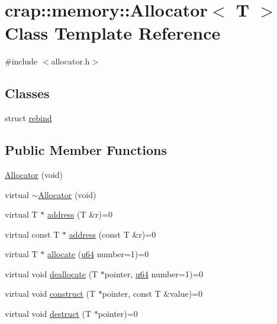\hypertarget{classcrap_1_1memory_1_1_allocator}{\section{crap\-:\-:memory\-:\-:Allocator$<$ T $>$ Class Template Reference}
\label{classcrap_1_1memory_1_1_allocator}
}


{\ttfamily \#include $<$allocator.\-h$>$}

\subsection*{Classes}
\begin{DoxyCompactItemize}
\item 
struct \hyperlink{structcrap_1_1memory_1_1_allocator_1_1rebind}{rebind}
\end{DoxyCompactItemize}
\subsection*{Public Member Functions}
\begin{DoxyCompactItemize}
\item 
\hyperlink{classcrap_1_1memory_1_1_allocator_a0a733c04219f6be60e9ed9ddd9bdad80}{Allocator} (void)
\item 
virtual \hyperlink{classcrap_1_1memory_1_1_allocator_a6be0eb49dc90689203ad23e6ed1a664e}{$\sim$\-Allocator} (void)
\item 
virtual T $\ast$ \hyperlink{classcrap_1_1memory_1_1_allocator_a0a04e5e641ea9b0d765a7f0bafce482d}{address} (T \&r)=0
\item 
virtual const T $\ast$ \hyperlink{classcrap_1_1memory_1_1_allocator_abedd358e5de8092792303b119b6a1355}{address} (const T \&r)=0
\item 
virtual T $\ast$ \hyperlink{classcrap_1_1memory_1_1_allocator_aad3aa11f0b2a31ff553e2ae6f27db3e7}{allocate} (\hyperlink{types_8h_a3f7e2bcbb0b4c338f3c4f6c937cd4234}{u64} number=1)=0
\item 
virtual void \hyperlink{classcrap_1_1memory_1_1_allocator_acc5e3ed67ea7bbc7648b0d37f783994f}{deallocate} (T $\ast$pointer, \hyperlink{types_8h_a3f7e2bcbb0b4c338f3c4f6c937cd4234}{u64} number=1)=0
\item 
virtual void \hyperlink{classcrap_1_1memory_1_1_allocator_a6c85873757816f4779ea60b9ad60a26d}{construct} (T $\ast$pointer, const T \&value)=0
\item 
virtual void \hyperlink{classcrap_1_1memory_1_1_allocator_a061a5dc6766ec78bad658e6b5ebd3069}{destruct} (T $\ast$pointer)=0
\end{DoxyCompactItemize}


